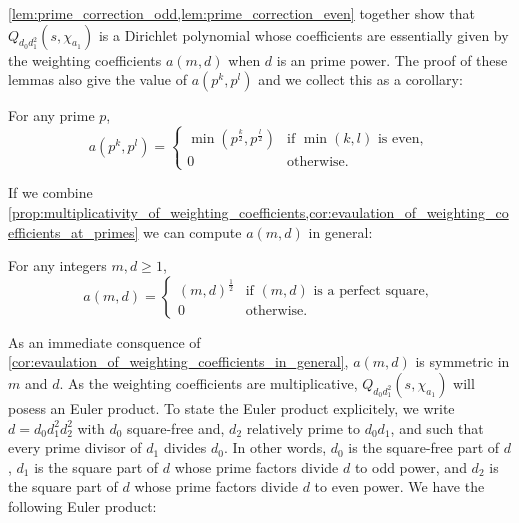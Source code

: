 \documentclass[12pt,reqno,oneside]{amsart}
\begin{document}
    \cref{lem:prime_correction_odd,lem:prime_correction_even} together show that $Q_{d_{0}d_{1}^{2}}(s,\chi_{a_{1}})$ is a Dirichlet polynomial whose coefficients are essentially given by the weighting coefficients $a(m,d)$ when $d$ is an prime power. The proof of these lemmas also give the value of $a(p^{k},p^{l})$ and we collect this as a corollary:

    \begin{corollary}\label{cor:evaulation_of_weighting_coefficients_at_primes}
        For any prime $p$,
        \[
            a(p^{k},p^{l}) = \begin{cases} \min\left(p^{\frac{k}{2}},p^{\frac{l}{2}}\right) & \text{if $\min(k,l)$ is even}, \\ 0 & \text{otherwise}. \end{cases}
        \]
    \end{corollary}

    If we combine \cref{prop:multiplicativity_of_weighting_coefficients,cor:evaulation_of_weighting_coefficients_at_primes} we can compute $a(m,d)$ in general:

    \begin{corollary}\label{cor:evaulation_of_weighting_coefficients_in_general}
        For any integers $m,d \ge 1$,
        \[
            a(m,d) = \begin{cases} (m,d)^{\frac{1}{2}} & \text{if $(m,d)$ is a perfect square}, \\ 0 & \text{otherwise}. \end{cases}
         \]
    \end{corollary}
    
    As an immediate consquence of \cref{cor:evaulation_of_weighting_coefficients_in_general}, $a(m,d)$ is symmetric in $m$ and $d$. As the weighting coefficients are multiplicative, $Q_{d_{0}d_{1}^{2}}(s,\chi_{a_{1}})$ will posess an Euler product. To state the Euler product explicitely, we write $d = d_{0}d_{1}^{2}d_{2}^{2}$ with $d_{0}$ square-free and, $d_{2}$ relatively prime to $d_{0}d_{1}$, and such that every prime divisor of $d_{1}$ divides $d_{0}$. In other words, $d_{0}$ is the square-free part of $d$, $d_{1}$ is the square part of $d$ whose prime factors divide $d$ to odd power, and $d_{2}$ is the square part of $d$ whose prime factors divide $d$ to even power. We have the following Euler product:
\end{document}
